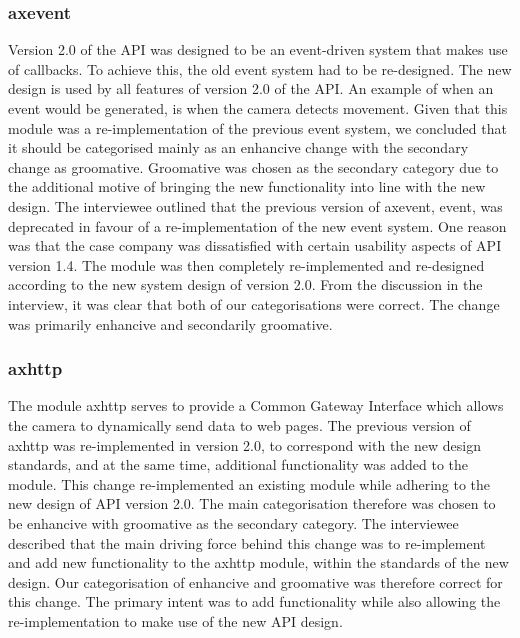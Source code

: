 \documentclass{sig-alternate}
\begin{document}
\subsubsection{axevent} %
Version 2.0 of the API was designed to be an event-driven system that makes use of callbacks. To achieve this, the old event system had to be re-designed. The new design is used by all features of version 2.0 of the API. An example of when an event would be generated, is when the camera detects movement.  Given that this module was a re-implementation of the previous event system, we concluded that it should be categorised mainly as an enhancive change with the secondary change as groomative. Groomative was chosen as the secondary category due to the additional motive of bringing the new functionality into line with the new design. The interviewee outlined that the previous version of axevent, event, was deprecated in favour of a re-implementation of the new event system. One reason was that the case company was dissatisfied with certain usability aspects of API version 1.4. The module was then completely re-implemented and re-designed according to the new system design of version 2.0. From the discussion in the interview, it was clear that both of our categorisations were correct. The change was primarily enhancive and secondarily groomative.

\subsubsection{axhttp} %
The module axhttp serves to provide a Common Gateway Interface which allows the camera to dynamically send data to web pages. The previous version of axhttp was re-implemented in version 2.0, to correspond with the new design standards, and at the same time, additional functionality was added to the module. This change re-implemented an existing module while adhering to the new design of API version 2.0. The main categorisation therefore was chosen to be enhancive with groomative as the secondary category. The interviewee described that the main driving force behind this change was to re-implement and add new functionality to the axhttp module, within the standards of the new design.  Our categorisation of enhancive and groomative was therefore correct for this change. The primary intent was to add functionality while also allowing the re-implementation to make use of the new API design. 
\end{document}
